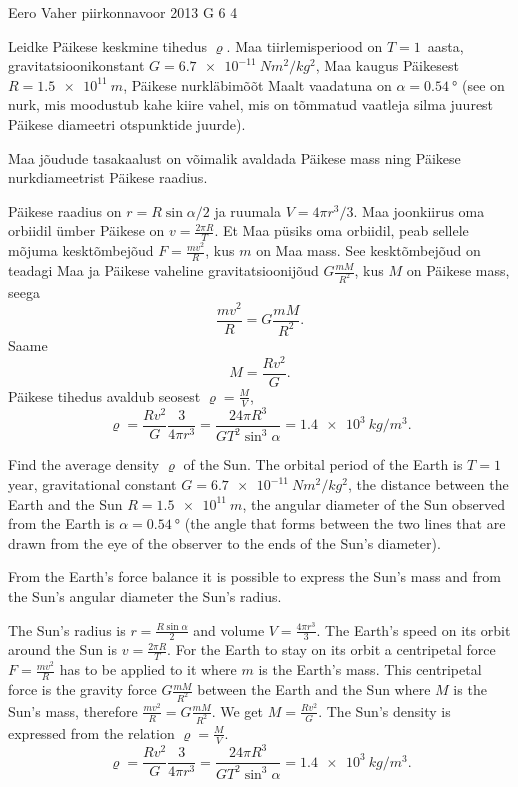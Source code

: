 {Eero Vaher} %
{piirkonnavoor} %
{2013} %
{G 6} %
{4} %
{
\ifStatement
Leidke Päikese keskmine tihedus $\varrho$. Maa
tiirlemisperiood on $T=1$~aasta, gravitatsioonikonstant 
$G=\SI{6.7e-11}{N m^2/kg^2}$, Maa kaugus Päikesest $R=\SI{1.5e11}{m}$, Päikese nurkläbimõõt Maalt vaadatuna on
$\alpha=\SI{0,54}{\degree}$ (see on nurk, mis moodustub kahe kiire vahel, mis on tõmmatud
vaatleja silma juurest Päikese diameetri otspunktide juurde).
\fi


\ifHint
Maa jõudude tasakaalust on võimalik avaldada Päikese mass ning Päikese nurkdiameetrist Päikese raadius.
\fi


\ifSolution
Päikese raadius on $r=R\sin\alpha/2$ ja ruumala $V=4\pi r^3/3$.
Maa joonkiirus oma orbiidil ümber Päikese on $v=\frac{2\pi R}{T}$. Et Maa püsiks oma orbiidil, peab sellele mõjuma kesktõmbejõud $F=\frac{mv^2}{R}$, kus $m$ on Maa mass. See kesktõmbejõud on teadagi Maa ja Päikese vaheline gravitatsioonijõud $G\frac{mM}{R^2}$, kus $M$ on Päikese mass, seega
\[
\frac{mv^2}{R}=G\frac{mM}{R^2}.
\]
Saame
\[
M=\frac{Rv^2}{G}.
\]
Päikese tihedus avaldub seosest $\varrho=\frac{M}{V}$, $$\varrho=\frac{Rv^2}{G} \frac{3}{4\pi r^3}=\frac{24 \pi R^3}{G T^2 \sin^3 \alpha}=\SI{1,4e3}{kg/m^3}.$$
\fi


\ifEngStatement
Find the average density $\varrho$ of the Sun. The orbital period of the Earth is $T=1$ year, gravitational constant $G=\SI{6.7e-11}{N m^2/kg^2}$, the distance between the Earth and the Sun $R=\SI{1.5e11}{m}$, the angular diameter of the Sun observed from the Earth is $\alpha=\SI{0,54}{\degree}$ (the angle that forms between the two lines that are drawn from the eye of the observer to the ends of the Sun’s diameter).
\fi


\ifEngHint
From the Earth’s force balance it is possible to express the Sun’s mass and from the Sun’s angular diameter the Sun’s radius.
\fi


\ifEngSolution
The Sun’s radius is $r=\frac{R\sin\alpha}{2}$ and volume $V=\frac{4\pi r^3}{3}$. The Earth’s speed on its orbit around the Sun is $v=\frac{2\pi R}{T}$. For the Earth to stay on its orbit a centripetal force $F=\frac{mv^2}{R}$ has to be applied to it where $m$ is the Earth’s mass. This centripetal force is the gravity force $G\frac{mM}{R^2}$ between the Earth and the Sun where $M$ is the Sun’s mass, therefore $\frac{mv^2}{R}=G\frac{mM}{R^2}$. We get $M=\frac{Rv^2}{G}$. The Sun’s density is expressed from the relation $\varrho=\frac{M}{V}$. 
$$\varrho=\frac{Rv^2}{G} \frac{3}{4\pi r^3}=\frac{24 \pi R^3}{G T^2 \sin^3 \alpha}=\SI{1,4e3}{kg/m^3}.$$
\fi
}